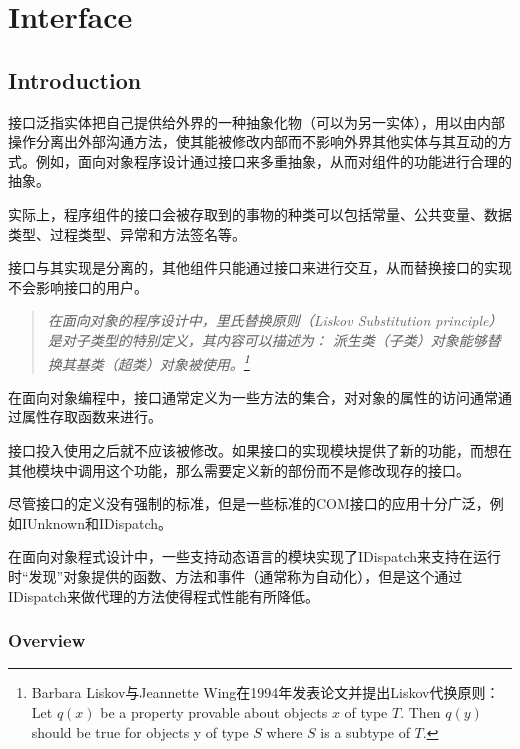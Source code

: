 \part{Interface}




\chapter{Introduction}

接口泛指实体把自己提供给外界的一种抽象化物（可以为另一实体），用以由内部操作分离出外部沟通方法，使其能被修改内部而不影响外界其他实体与其互动的方式。例如，面向对象程序设计通过接口来多重抽象，从而对组件的功能进行合理的抽象。

实际上，程序组件的接口会被存取到的事物的种类可以包括常量、公共变量、数据类型、过程类型、异常和方法签名等。

接口与其实现是分离的，其他组件只能通过接口来进行交互，从而替换接口的实现不会影响接口的用户。

\begin{quote}
\emph{在面向对象的程序设计中，里氏替换原则（Liskov Substitution principle）是对子类型的特别定义，其内容可以描述为： 派生类（子类）对象能够替换其基类（超类）对象被使用。\footnote{Barbara Liskov与Jeannette Wing在1994年发表论文并提出Liskov代换原则：\newline Let $q(x)$ be a property provable about objects $x$ of type $T$. Then $q(y)$ should be true for objects y of type $S$ where $S$ is a subtype of $T$.}}
\end{quote}

在面向对象编程中，接口通常定义为一些方法的集合，对对象的属性的访问通常通过属性存取函数来进行。


接口投入使用之后就不应该被修改。如果接口的实现模块提供了新的功能，而想在其他模块中调用这个功能，那么需要定义新的部份而不是修改现存的接口。

尽管接口的定义没有强制的标准，但是一些标准的COM接口的应用十分广泛，例如IUnknown和IDispatch。

在面向对象程式设计中，一些支持动态语言的模块实现了IDispatch来支持在运行时“发现”对象提供的函数、方法和事件（通常称为自动化），但是这个通过IDispatch来做代理的方法使得程式性能有所降低。



\section{Overview}



